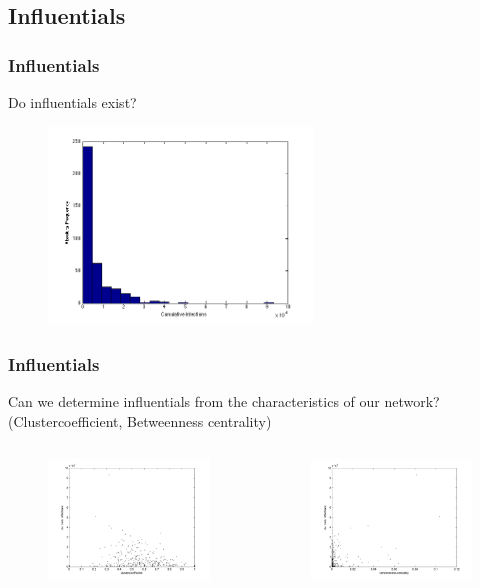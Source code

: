 \documentclass{beamer}
\begin{document}
\subsection{Influentials}
\begin{frame}
\frametitle{Influentials}

Do influentials exist?

\begin{figure}
\includegraphics[width=7cm]{influ2}
\label{Histo}
\end{figure}


\end{frame}


\begin{frame}
\frametitle{Influentials}

Can we determine influentials from the characteristics of our network? (Clustercoefficient, Betweenness centrality)
\begin{columns}[c]

\begin{figure}
\includegraphics[width=6cm]{clustercVSov_cum_inf}
\end{figure}
\begin{figure}
\includegraphics[width=6cm]{betwVSov_cum_inf}
\end{figure}
\end{columns}

\end{frame}
\end{document}
